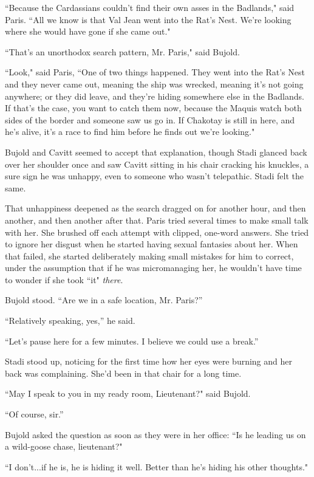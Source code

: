 \documentclass[twoside,letterpaper,12pt]{memoir}
\begin{document}
``Because the Cardassians couldn't find their own asses in the Badlands," said Paris. ``All we know is that Val Jean went into the Rat's Nest. We're looking where she would have gone if she came out."

``That's an unorthodox search pattern, Mr. Paris," said Bujold.

``Look," said Paris, ``One of two things happened. They went into the Rat's Nest and they never came out, meaning the ship was wrecked, meaning it's not going anywhere; or they did leave, and they're hiding somewhere else in the Badlands. If that's the case, you want to catch them now, because the Maquis watch both sides of the border and someone saw us go in. If Chakotay is still in here, and he's alive, it's a race to find him before he finds out we're looking."

Bujold and Cavitt seemed to accept that explanation, though Stadi glanced back over her shoulder once and saw Cavitt sitting in his chair cracking his knuckles, a sure sign he was unhappy, even to someone who wasn’t telepathic. Stadi felt the same.

That unhappiness deepened as the search dragged on for another hour, and then another, and then another after that. Paris tried several times to make small talk with her. She brushed off each attempt with clipped, one-word answers. She tried to ignore her disgust when he started having sexual fantasies about her. When that failed, she started deliberately making small mistakes for him to correct, under the assumption that if he was micromanaging her, he wouldn't have time to wonder if she took ``it" \textit{there}.

Bujold stood. ``Are we in a safe location, Mr. Paris?''

``Relatively speaking, yes,'' he said.

``Let’s pause here for a few minutes. I believe we could use a break.''

Stadi stood up, noticing for the first time how her eyes were burning and her back was complaining. She’d been in that chair for a long time.

``May I speak to you in my ready room, Lieutenant?" said Bujold.

``Of course, sir.''

Bujold asked the question as soon as they were in her office: ``Is he leading us on a wild-goose chase, lieutenant?"

``I don't...if he is, he is hiding it well. Better than he's hiding his other thoughts."
\end{document}
